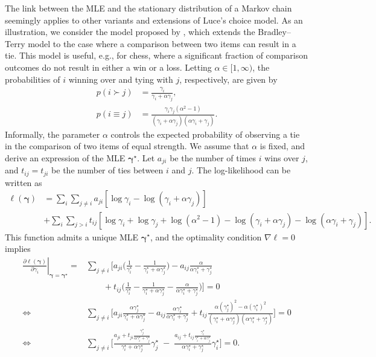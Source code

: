 The link between the MLE and the stationary distribution of a Markov chain seemingly applies to other variants and extensions of Luce's choice model.
As an illustration, we consider the model proposed by \citet{rao1967ties}, which extends the Bradley--Terry model to the case where a comparison between two items can result in a tie.
This model is useful, e.g., for chess, where a significant fraction of comparison outcomes do not result in either a win or a loss.
Letting $\alpha \in [1, \infty)$, the probabilities of $i$ winning over and tying with $j$, respectively, are given by
\begin{align*}
p(i \succ j) &= \frac{\gamma_i}{\gamma_i + \alpha \gamma_j}, \\
p(i \equiv j) &= \frac{\gamma_i \gamma_j(\alpha^2 - 1)}{(\gamma_i + \alpha\gamma_j)(\alpha \gamma_i + \gamma_j)}.
\end{align*}
Informally, the parameter $\alpha$ controls the expected probability of observing a tie in the comparison of two items of equal strength.
We assume that $\alpha$ is fixed, and derive an expression of the MLE $\bm{\gamma}^\star$.
Let $a_{ji}$ be the number of times $i$ wins over $j$, and $t_{ij} = t_{ji}$ be the number of ties between $i$ and $j$.
The log-likelihood can be written as
\begin{align*}
\ell(\bm{\gamma}) &=
  \sum_i \sum_{j \ne i}
  a_{ji} \left[ \log \gamma_i - \log(\gamma_i + \alpha \gamma_j) \right] \\
    &+ \sum_i \sum_{j > i}
    t_{ij} \left[ \log \gamma_i + \log \gamma_j  + \log(\alpha^2 - 1)
     - \log(\gamma_i + \alpha \gamma_j) - \log(\alpha \gamma_i + \gamma_j) \right].
\end{align*}
This function admits a unique MLE $\bm{\gamma}^\star$, and the optimality condition $\nabla \ell = 0$ implies
\begin{align*}
\left. \frac{\partial \ell(\bm{\gamma})}{\partial \gamma_i} \right\rvert_{\bm{\gamma}= \bm{\gamma}^\star}
    = &\sum_{j \ne i} \Bigg[ a_{ji} \bigg( \frac{1}{\gamma^\star_i} - \frac{1}{\gamma^\star_i + \alpha \gamma^\star_j} \bigg)
      - a_{ij} \frac{\alpha}{\alpha \gamma^\star_i + \gamma^\star_j} \\
      & \qquad {} + t_{ij} \bigg( \frac{1}{\gamma^\star_i} - \frac{1}{\gamma^\star_i + \alpha \gamma^\star_j} - \frac{\alpha}{\alpha \gamma^\star_i + \gamma^\star_j} \bigg) \Bigg] = 0 \\
    \iff & \sum_{j \ne i} \Bigg[ a_{ji} \frac{\alpha \gamma^\star_j}{\gamma^\star_i + \alpha \gamma^\star_j}
      - a_{ij} \frac{\alpha \gamma^\star_i}{\alpha \gamma^\star_i + \gamma^\star_j}
      + t_{ij} \frac{\alpha (\gamma^\star_j)^2 - \alpha (\gamma^\star_i)^2}{(\gamma^\star_i + \alpha \gamma^\star_j)(\alpha \gamma^\star_i + \gamma^\star_j)} \Bigg] = 0 \\
    \iff & \sum_{j \ne i} \Bigg[ \frac{a_{ji} + t_{ji}\tfrac{\gamma^\star_j}{\alpha \gamma^\star_i + \gamma^\star_j}}{\gamma^\star_i + \alpha \gamma^\star_j} \gamma^\star_j
      \; - \; \frac{a_{ij} + t_{ij}\tfrac{\gamma^\star_i}{\gamma^\star_i + \alpha \gamma^\star_j}}{\alpha \gamma^\star_i + \gamma^\star_j} \gamma^\star_i \Bigg] = 0.
\end{align*}
